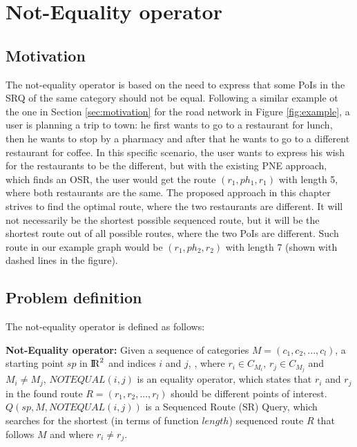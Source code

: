 


\section{Not-Equality operator}

\subsection{Motivation}
\label{sec:motNEO}
The not-equality operator is based on the need to express that some PoIs in the SRQ of the same category should not be equal. Following a similar example ot the one in Section \ref{sec:motivation} for the road network in Figure \ref{fig:example}, a user is planning a trip to town: he first wants to go to a restaurant for lunch, then he wants to stop by a pharmacy and after that he wants to go to a different restaurant for coffee. In this specific scenario, the user wants to express his wish for the restaurants to be the different, but with the existing PNE \cite{OSR} approach, which finds an OSR, the user would get the route $(r_1, ph_1, r_1)$ with length 5, where both restaurants are the same. The proposed approach in this chapter strives to find the optimal route, where the two restaurants are different. It will not necessarily be the shortest possible sequenced route, but it will be the shortest route out of all possible routes, where the two PoIs are different. Such route in our example graph would be $(r_1, ph_2, r_2)$ with length 7 (shown with dashed lines in the figure).

\subsection{Problem definition} 
\label{sec:problemNEO}
The not-equality operator is defined as follows:

\textbf{Not-Equality operator:} Given a sequence of categories $M = (c_1, c_2, ..., c_l)$, a starting point $sp$ in ${\rm I\!R}^2$ and indices $i$ and $j$, , where $r_i \in C_{M_{i}}$, $r_j \in C_{M_{j}}$ and $M_i \neq M_j$, $NOTEQUAL(i, j)$ is an equality operator, which states that $r_i$ and $r_j$ in the found route $R = (r_1, r_2, ..., r_l)$ should be different points of interest.
$Q(sp, M, NOTEQUAL(i, j))$ is a Sequenced Route (SR) Query, which searches for the shortest (in terms of function $length$) sequenced route $R$ that follows $M$ and where $r_i \neq r_j$.

